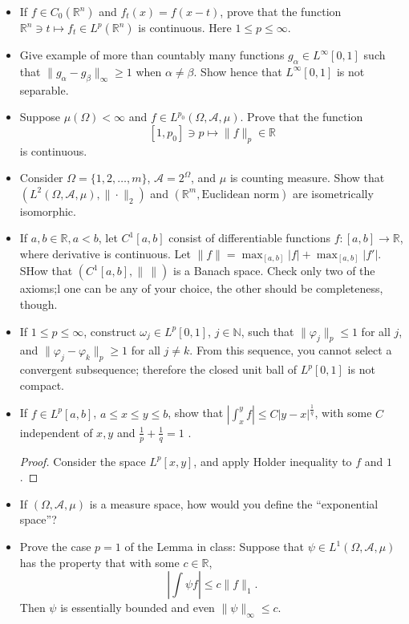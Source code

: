 
\begin{itemize}
	\item If $f \in C_0(\mathbb{R}^n)$ and $f_t(x) = f(x-t)$, prove that the function $\mathbb{R}^n \ni t \mapsto f_t \in L^p(\mathbb{R}^n)$ is continuous. Here $1 \le p \le  \infty $.
	\item Give example of more than countably many functions $g_\alpha \in L^\infty [0,1]$ such that $\| g_\alpha - g_\beta\|_{\infty }\ge 1$ when $\alpha \neq  \beta$. Show hence that $L^\infty [0,1]$ is not separable.
	\item Suppose $\mu(\Omega) < \infty $ and $f \in L^{p_0}(\Omega, \mathcal{A}, \mu)$. Prove that the function
		\[
			[1, p_0] \ni p \mapsto \|f\|_p \in \mathbb{R}
		\] 
		is continuous.
	\item Consider $\Omega = \{1, 2, \ldots, m\} $, $\mathcal{A} = 2^\Omega$, and $\mu$ is counting measure. Show that $\left( L^2(\Omega, \mathcal{A}, \mu), \|\cdot\|_2 \right) $ and $\left( \mathbb{R}^m, \text{Euclidean norm} \right) $ are isometrically isomorphic.
	\item If $a, b \in \mathbb{R}, a < b$, let $C^1[a,b] $ consist of differentiable functions $f: [a,b] \to \mathbb{R}$, where derivative is continuous. Let $\|f \| = \max_{[a,b]}|f| + \max_{[a,b]}|f'|$. SHow that $\left( C^1[a,b], \|\,\| \right) $ is a Banach space. Check only two of the axioms;l one can be any of your choice, the other should be completeness, though.
	\item If $1 \le p \le \infty $, construct $\omega_j \in L^p[0,1]$, $j \in \mathbb{N}$, such that $\|\varphi_j\|_p \le 1$ for all $j$, and $\| \varphi_j - \varphi_k\|_p \ge 1$ for all $j \neq k$. From this sequence, you cannot select a convergent subsequence; therefore the closed unit ball of $L^p[0,1]$ is not compact.
	\item If $f \in L^p[a,b]$, $a \le x \le y \le b$, show that $\left| \int _x^y f \right|  \le  C |y - x| ^{\frac{1}{q}}$, with some $C$ independent of $x, y$ and $\frac{1}{p} + \frac{1}{q} = 1$ .
\begin{proof}
	Consider the space $L^p[x,y]$, and apply Holder inequality to $f$ and $1$.
\end{proof}

	\item If $(\Omega, \mathcal{A}, \mu)$ is a measure space, how would you define the ``exponential space''?
	\item Prove the case $p = 1$ of the Lemma in class: Suppose that $\psi \in L^1(\Omega, \mathcal{A}, \mu)$ has the property that with some $c \in \mathbb{R}$,
		\[
			\left| \int \psi f \right|  \le  c \|f\|_1
		.\] 
		Then $\psi$ is essentially bounded and even $\|\psi\|_\infty \le c$.


\end{itemize}
